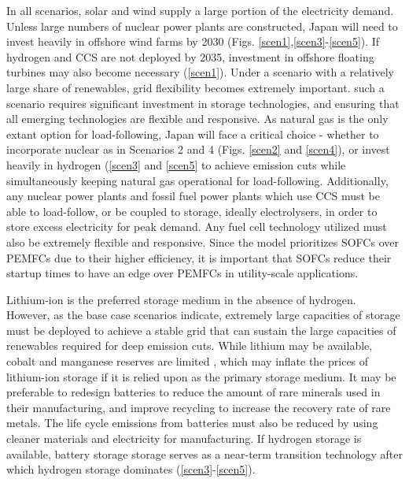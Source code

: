 In all scenarios, solar and wind supply a large portion of the electricity demand. Unless large numbers of nuclear power plants are constructed, Japan will need to invest heavily in offshore wind farms by 2030 (Figs. \ref{scen1},\ref{scen3}-\ref{scen5}). If hydrogen and CCS are not deployed by 2035, investment in offshore floating turbines may also become necessary (\ref{scen1}). Under a scenario with a relatively large share of renewables, grid flexibility becomes extremely important. such a scenario requires significant investment in storage technologies, and ensuring that all emerging technologies are flexible and responsive. As natural gas is the only extant option for load-following, Japan will face a critical choice - whether to incorporate nuclear as in Scenarios 2 and 4 (Figs. \ref{scen2} and \ref{scen4}), or invest heavily in hydrogen (\ref{scen3} and \ref{scen5} to achieve emission cuts while simultaneously keeping natural gas operational for load-following. Additionally, any nuclear power plants and fossil fuel power plants which use CCS must be able to load-follow, or be coupled to storage, ideally electrolysers, in order to store excess electricity for peak demand. Any fuel cell technology utilized must also be extremely flexible and responsive. Since the model prioritizes \gls{SOFC}s over \gls{PEMFC}s due to their higher efficiency, it is important that \gls{SOFC}s reduce their startup times to have an edge over \gls{PEMFC}s in utility-scale applications.

Lithium-ion is the preferred storage medium in the absence of hydrogen. However, as the base case scenarios indicate, extremely large capacities of storage must be deployed to achieve a stable grid that can sustain the large capacities of renewables required for deep emission cuts. While lithium may be available, cobalt and manganese reserves are limited \cite{scrosati_lithium-ion_2011,simon_potential_2015,turcheniuk_ten_2018} , which may inflate the prices of lithium-ion storage if it is relied upon as the primary storage medium. It may be preferable to redesign batteries to reduce the amount of rare minerals used in their manufacturing, and improve recycling to increase the recovery rate of rare metals. The life cycle emissions from batteries must also be reduced by using cleaner materials and electricity for manufacturing. If hydrogen storage is available, battery storage storage serves as a near-term transition technology after which hydrogen storage dominates (\ref{scen3}-\ref{scen5}).

